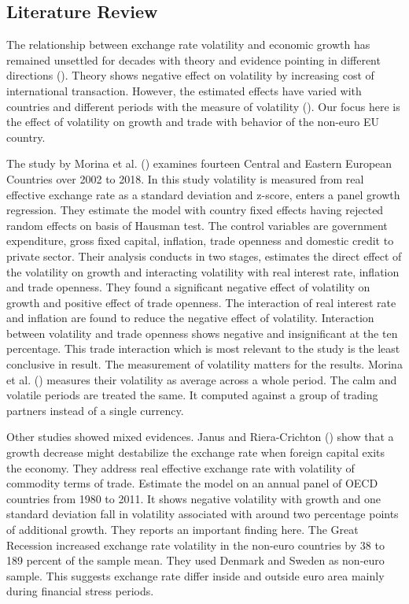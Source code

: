 \subsection{Literature Review}\label{subsec:lit_review} 

The relationship between exchange rate volatility and economic growth has remained unsettled for decades with theory and evidence pointing in different directions (\cite{morina_effect_2020}).
Theory shows negative effect on volatility by increasing cost of international transaction.
However, the estimated effects have varied with countries and different periods with the measure of volatility (\cite{clark_new_2004}).
Our focus here is the effect of volatility on growth and trade with behavior of the non-euro EU country.

\vspace{\baselineskip}

The study by Morina et al. (\citeyear{morina_effect_2020}) examines fourteen Central and Eastern European Countries over 2002 to 2018.
In this study volatility is measured from real effective exchange rate as a standard deviation and z-score, enters a panel growth regression.
They estimate the model with country fixed effects having rejected random effects on basis of Hausman test.
The control variables are government expenditure, gross fixed capital, inflation, trade openness and domestic credit to private sector.
Their analysis conducts in two stages, estimates the direct effect of the volatility on growth and interacting volatility with real interest rate, inflation and trade openness.
They found a significant negative effect of volatility on growth and positive effect of trade openness.
The interaction of real interest rate and inflation are found to reduce the negative effect of volatility.
Interaction between volatility and trade openness shows negative and insignificant at the ten percentage.
This trade interaction which is most relevant to the study is the least conclusive in result.
The measurement of volatility matters for the results.
Morina et al. (\citeyear{morina_effect_2020}) measures their volatility as average across a whole period. 
The calm and volatile periods are treated the same. 
It computed against a group of trading partners instead of a single currency.

\vspace{\baselineskip}

Other studies showed mixed evidences. Janus and Riera-Crichton (\citeyear{thorsten_pdf_2015}) show that a growth decrease might destabilize the exchange rate when foreign capital exits the economy.
They address real effective exchange rate with volatility of commodity terms of trade.
Estimate the model on an annual panel of OECD countries from 1980 to 2011.
It shows negative volatility with growth and one standard deviation fall in volatility associated with around two percentage points of additional growth.
They reports an important finding here. The Great Recession increased exchange rate volatility in the non-euro countries by 38 to 189 percent of the sample mean.
They used Denmark and Sweden as non-euro sample. This suggests exchange rate differ inside and outside euro area mainly during financial stress periods.

